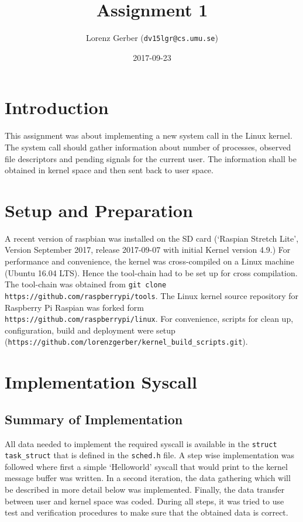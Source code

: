 \documentclass[a4paper,11pt,twoside]{article}
\title{Assignment 1}
\author{Lorenz Gerber ({\tt{dv15lgr@cs.umu.se}})}
\date{2017-09-23}
\begin{document}
\lstset{language=C}
\maketitle
\thispagestyle{empty}
\newpage

\clearpage
{}

\section{Introduction}
This assignment was about implementing a new system call in the Linux kernel.
The system call should gather information about number of processes, observed
file descriptors and pending signals for the current user. The information shall
be obtained in kernel space and then sent back to user space.

\section{Setup and Preparation}
A recent version of raspbian was installed on the SD card (`Raspian
Stretch Lite', Version September 2017, release 2017-09-07 with initial Kernel
version 4.9.) For performance and convenience, the kernel was cross-compiled on a
Linux machine (Ubuntu 16.04 LTS). Hence the tool-chain had to be set up for
cross compilation. The tool-chain was obtained from
\verb+git clone https://github.com/raspberrypi/tools+.
The Linux kernel source repository for Raspberry Pi Raspian was forked form
\verb+https://github.com/raspberrypi/linux+. For convenience, scripts for clean
up, configuration, build and deployment were setup
(\verb+https://github.com/lorenzgerber/kernel_build_scripts.git+).

\section{Implementation Syscall}
\subsection{Summary of Implementation}
All data needed to implement the required syscall is available in the
\verb+struct task_struct+ that is defined in the \verb+sched.h+ file. A step wise
implementation was followed where first a simple `Helloworld' syscall that
would print to the kernel message buffer was written. In a second iteration,
the data gathering which will be described in more detail below was implemented.
Finally, the data transfer between user and kernel space was coded. During all
steps, it was tried to use test and verification procedures to make sure that
the obtained data is correct.
\end{document}
